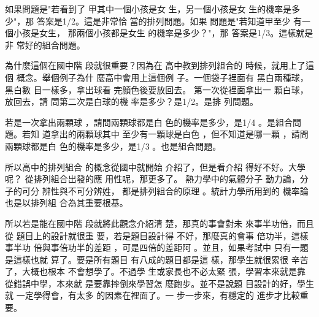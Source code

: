 \documentclass[12pt]{article}
\begin{document}
\bigskip

如果問題是"若看到了%
甲其中一個小孩是女%
生，另一個小孩是女%
生的機率是多少"，那%
答案是1/2。這是非常恰%
當的排列問題。如果%
問題是"若知道甲至少%
有一個小孩是女生，%
那兩個小孩都是女生%
的機率是多少？"，那%
答案是1/3。這樣就是非%
常好的組合問題。

\bigskip

為什麼這個在國中階%
段就很重要？因為在%
高中教到排列組合的%
時候，就用上了這個%
概念。舉個例子為什%
麼高中會用上這個例%
子。一個袋子裡面有%
黑白兩種球，黑白數%
目一樣多，拿出球看%
完顏色後要放回去。%
第一次從裡面拿出一%
顆白球，放回去，請%
問第二次是白球的機%
率是多少？是1/2。是排%
列問題。

\bigskip

若是一次拿出兩顆球%
，請問兩顆球都是白%
色的機率是多少，是1/4%
。是組合問題。若知%
道拿出的兩顆球其中%
至少有一顆球是白色%
，但不知道是哪一顆%
，請問兩顆球都是白%
色的機率是多少，是1/3%
。也是組合問題。

\bigskip

所以高中的排列組合%
的概念從國中就開始%
介紹了，但是看介紹%
得好不好。大學呢？%
從排列組合出發的應%
用性呢，那更多了。%
熱力學中的氣體分子%
動力論，分子的可分%
辨性與不可分辨姓，%
都是排列組合的原理%
。統計力學所用到的%
機率論也是以排列組%
合為其重要根基。

\bigskip

所以若是能在國中階%
段就將此觀念介紹清%
楚，那真的事會對未%
來事半功倍，而且從%
題目上的設計就很重%
要，若是題目設計得%
不好，那麼真的會事%
倍功半，這樣事半功%
倍與事倍功半的差距%
，可是四倍的差距阿%
。並且，如果考試中%
只有一題是這樣也就%
算了。要是所有題目%
有八成的題目都是這%
樣，那學生就很累很%
辛苦了，大概也根本%
不會想學了。不過學%
生或家長也不必太緊%
張，學習本來就是靠%
從錯誤中學，本來就%
是要靠摔倒來學習怎%
麼跑步。並不是說題%
目設計的好，學生就%
一定學得會，有太多%
的因素在裡面了。一%
步一步來，有穩定的%
進步才比較重要。
\end{document}
